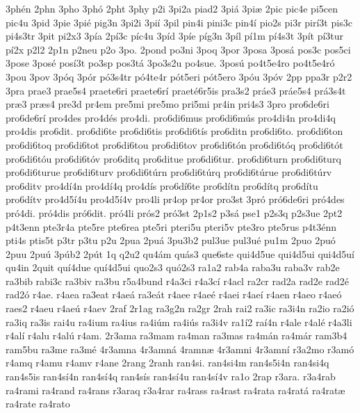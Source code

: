 {3ph^^e9n
2phn
3pho
3ph^^f3
2pht
3phy
p2i
3pi2a
piad2
3pi^^e1
3pi^^e6
2pic
pic4e
pi5cen
pic4u
3pid
3pie
3pi^^e9
pig3n
3pi2i
3pi^^ed
3pil
pin4i
pini3c
pin4^^ed
pio2s
pi3r
pir^^ed3t
pis3c
pi4s3tr
3pit
pi2x3
3p^^eda
2p^^ed3c
p^^edc4u
3p^^edd
3p^^ede
p^^edg3n
3p^^edl
p^^ed1m
p^^ed4s3t
3p^^edt
p^^ed3tur
p^^ed2x
p2l2
2p1n
p2neu
p2o
3po.
2pond
po3ni
3poq
3por
3posa
3pos^^e1
pos3c
pos5ci
3pose
3pos^^e9
pos^^ed3t
po3sp
pos3t^^e1
3po3s2u
po4sue.
3pos^^fa
po4t5e4ro
po4t5e4r^^f3
3pou
3pov
3p^^f3q
3p^^f3r
p^^f33s4tr
p^^f34te4r
p^^f3t5eri
p^^f3t5ero
3p^^f3u
3p^^f3v
2pp
ppa3r
p2r2
3pra
prae3
prae5s4
praete6ri
praete6r^^ed
praet^^e96r5is
pra3s2
pr^^e1e3
pr^^e1e5s4
pr^^e13s4t
pr^^e63
pr^^e6s4
pre3d
pr4em
pre5mi
pre5mo
pri5mi
pr4in
pri4s3
3pro
pro6de6ri
pro6de6r^^ed
pro4des
pro4d^^e9s
pro4di.
pro6di6mus
pro6di6m^^fas
pro4di4n
pro4di4q
pro4dis
pro6dit.
pro6di6te
pro6di6tis
pro6di6t^^eds
pro6ditn
pro6di6to.
pro6di6ton
pro6di6toq
pro6di6tot
pro6di6tou
pro6di6tov
pro6di6t^^f3n
pro6di6t^^f3q
pro6di6t^^f3t
pro6di6t^^f3u
pro6di6t^^f3v
pro6ditq
pro6ditue
pro6di6tur.
pro6di6turn
pro6di6turq
pro6di6turue
pro6di6turv
pro6di6t^^farn
pro6di6t^^farq
pro6di6t^^farue
pro6di6t^^farv
pro6ditv
pro4d^^ed4n
pro4d^^ed4q
pro4d^^eds
pro6d^^ed6te
pro6d^^edtn
pro6d^^edtq
pro6d^^edtu
pro6d^^edtv
pro4d5^^ed4u
pro4d5^^ed4v
pro4li
pr4op
pr4or
pro3st
3pr^^f3
pr^^f36de6ri
pr^^f34des
pr^^f34di.
pr^^f34dis
pr^^f36dit.
pr^^f34li
pr^^f3s2
pr^^f33st
2p1s2
p3s^^e1
pse1
p2s3q
p2s3ue
2pt2
p4t3enn
pte3r4a
pte5re
pte6rea
pte5ri
pteri5u
pteri5v
pte3ro
pte5rus
p4t3^^e9nn
pti4s
ptis5t
p3tr
p3tu
p2u
2pua
2pu^^e1
3pu3b2
pul3ue
pul3u^^e9
pu1m
2puo
2pu^^f3
2puu
2pu^^fa
3p^^fab2
2p^^fat
1q
q2u2
qu4^^e1m
qu^^e1s3
que6ste
qui4d5ue
qui4d5ui
qui4d5u^^ed
qu4in
2quit
qu^^ed4due
qu^^ed4d5ui
quo2s3
qu^^f32s3
ra1a2
rab4a
raba3u
raba3v
rab2e
ra3bib
rabi3c
ra3biv
ra3bu
r5a4bund
r4a3ci
r4a3c^^ed
r4acl
ra2cr
rad2a
rad2e
rad2^^e9
rad2^^f3
r4ae.
r4aea
ra3eat
r4ae^^e1
ra3e^^e1t
r4aee
r4ae^^e9
r4aei
r4ae^^ed
r4aen
r4aeo
r4ae^^f3
raes2
r4aeu
r4ae^^fa
r4aev
2raf
2r1ag
ra3g2n
ra2gr
2rah
rai2
ra3ic
ra3i4n
ra2io
ra2i^^f3
ra3iq
ra3is
rai4u
ra4ium
ra4ius
ra4i^^fam
ra4i^^fas
ra3i4v
ra1^^ed2
ra^^ed4n
r4ale
r4al^^e9
r4a3li
r4al^^ed
r4alu
r4al^^fa
r4am.
2r3ama
ra3mam
ra4man
ra3mas
ra4m^^e1n
ra4m^^e1r
ram3b4
ram5bu
ra3me
ra3m^^e9
4r3amna
4r3amn^^e1
4ramn^^e6
4r3amni
4r3amn^^ed
r3a2mo
r3am^^f3
r4amq
r4amu
r4amv
r4ane
2rang
2ranh
ran4si.
ran4si4m
ran4s5i4n
ran4si4q
ran4s5is
ran4s^^ed4n
ran4s^^ed4q
ran4s^^eds
ran4s^^ed4u
ran4s^^ed4v
ra1o
2rap
r3ara.
r3a4rab
ra4rami
ra4rand
ra4rans
r3araq
r3a4rar
ra4rass
ra4rast
ra4rata
ra4rat^^e1
ra4rat^^e6
ra4rate
ra4rato
}

